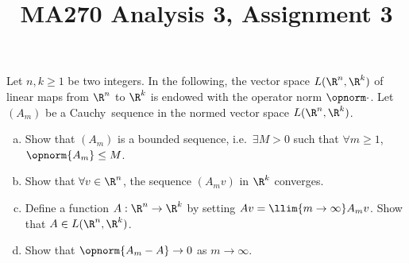 \documentclass[a4paper]{article}
\title{MA270 Analysis 3, Assignment 3}
\begin{document}
\maketitle

\setlength{\parindent}{0em}
\setlength{\parskip}{1em}


\begin{questionbody}
Let $n, k \ge 1$ be two integers. In the following, the vector space $L(\R^n, \R^k)$ of linear maps from $\R^n$ to $\R^k$ is endowed with the operator norm $\opnorm \cdot$. Let $(A_m)$ be a Cauchy~sequence in the normed vector space $L(\R^n, \R^k)$.
\begin{enumerate}[(a)]
\item Show that $(A_m)$ is a bounded sequence, i.e.\ $\exists M > 0$ such that $\forall m \ge 1$, $\opnorm{A_m} \le M$.

\item Show that $\forall v \in \R^n$, the sequence $(A_m v)$ in $\R^k$ converges.

\item Define a function $A : \R^n \to \R^k$ by setting $A v = \llim{m \to \infty} A_m v$. Show that $A \in L(\R^n, \R^k)$.

\item Show that $\opnorm{A_m - A} \to 0$ as $m \to \infty$.


\end{enumerate}
\end{questionbody}
\end{document}
